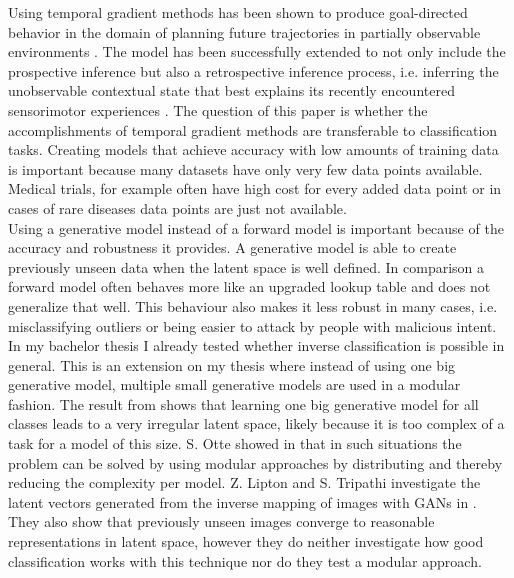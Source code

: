 \documentclass{article}
\begin{document}
Using temporal gradient methods has been shown to produce goal-directed behavior in the domain of planning future trajectories in partially observable environments \cite{RocketballOtte2017}.
The model has been successfully extended to not only include the prospective inference but also a retrospective inference process, i.e. inferring the unobservable contextual state that best explains its recently encountered sensorimotor experiences \cite{REPRISE2018}.
The question of this paper is whether the accomplishments of temporal gradient methods are transferable to classification tasks. 
Creating models that achieve accuracy with low amounts of training data is important because many datasets have only very few data points available. Medical trials, for example often have high cost for every added data point or in cases of rare diseases data points are just not available. \\
Using a generative model instead of a forward model is important because of the accuracy and robustness it provides. A generative model is able to create previously unseen data when the latent space is well defined. In comparison a forward model often behaves more like an upgraded lookup table and does not generalize that well. This behaviour also makes it less robust in many cases, i.e. misclassifying outliers or being easier to attack by people with malicious intent. \\
In my bachelor thesis \cite{HobbhahnBA2018} I already tested whether inverse classification is possible in general. This is an extension on my thesis where instead of using one big generative model, multiple small generative models are used in a modular fashion. The result from \cite{HobbhahnBA2018} shows that learning one big generative model for all classes leads to a very irregular latent space, likely because it is too complex of a task for a model of this size. S. Otte showed in \cite{2019_icann_dynamics} that in such situations the problem can be solved by using modular approaches by distributing and thereby reducing the complexity per model. Z. Lipton and S. Tripathi investigate the latent vectors generated from the inverse mapping of images with GANs in \cite{LatentVectors2017}. They also show that previously unseen images converge to reasonable representations in latent space, however they do neither investigate how good classification works with this technique nor do they test a modular approach. 
\par
\end{document}
